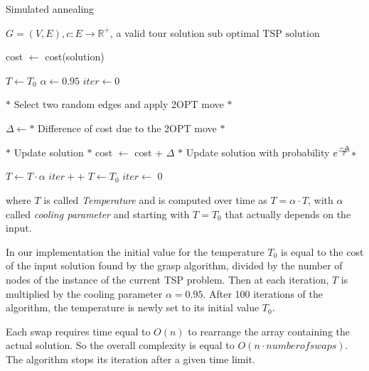 \begin{algorithm}[!h]
    \caption{Simulated annealing}\label{algo:SimulatedAnnealing}
    \begin{algorithmic}[1]
    \Require $G = (V,E), c:E \to \mathbb{R}^+$, a valid tour solution
    \Ensure $\text{sub optimal TSP solution}$

    \State cost $\gets$ cost(solution)

    \State $T \gets   T_0 $
    \State $ \alpha \gets  0.95 $
    \State $ iter \gets  0 $
   




    

    \State $*$ Select two random edges and apply 2OPT move $*$

    
    \State $\Delta \gets *$ Difference of cost due to the 2OPT move $*$  
    
    
    \State $*$ Update solution $*$
    \State cost $\gets$ cost + $\Delta$
    \Else 
    \State $*$ Update solution with probability $ e^{-\Delta \over T}*$

    \EndIf

    \State $T \gets T \cdot \alpha$
    \State $iter++ $
    \State $T \gets   T_0$
    \State $iter \gets  $ 0
    \EndIf
    

    \EndWhile

    \end{algorithmic}
\end{algorithm}

where $T$ is called \textit{Temperature} and is computed over time as $T = \alpha \cdot T$, with $\alpha$ called \textit{cooling parameter} and starting with $T = T_0$ that actually depends on the input.

In our implementation the initial value for the temperature $T_0$ is equal to the cost of the input solution found by the grasp algorithm, divided by the number of nodes of the instance of the current TSP problem. Then at each iteration, $T$ is multiplied by the cooling parameter $\alpha = 0.95$. After 100 iterations of the algorithm, the temperature is newly set to its initial value $T_0$.

Each swap requires time equal to $O(n)$ to rearrange the array containing the actual solution. So the overall complexity is equal to $O(n \cdot number of swaps)$.
The algorithm stops its iteration after a given time limit.

